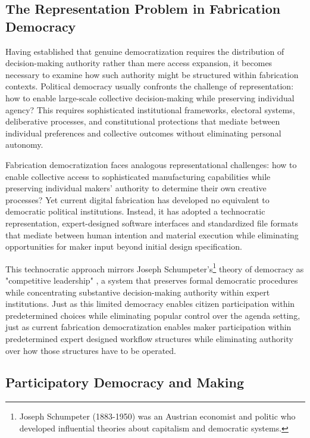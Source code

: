 \subsection{The Representation Problem in Fabrication Democracy}

Having established that genuine democratization requires the distribution of decision-making authority rather than mere access expansion, it becomes necessary to examine how such authority might be structured within fabrication contexts. Political democracy usually confronts the challenge of representation: how to enable large-scale collective decision-making while preserving individual agency? This requires sophisticated institutional frameworks, electoral systems, deliberative processes, and constitutional protections that mediate between individual preferences and collective outcomes without eliminating personal autonomy.

\vspace{0.5cm}

Fabrication democratization faces analogous representational challenges: how to enable collective access to sophisticated manufacturing capabilities while preserving individual makers' authority to determine their own creative processes? Yet current digital fabrication has developed no equivalent to democratic political institutions. Instead, it has adopted  a technocratic representation, expert-designed software interfaces and standardized file formats that mediate between human intention and material execution while eliminating opportunities for maker input beyond initial design specification.

\vspace{0.5cm}

This technocratic approach mirrors Joseph Schumpeter's\footnote{Joseph Schumpeter (1883-1950) was an Austrian economist and politic who developed influential theories about capitalism and democratic systems.} theory of democracy as "competitive leadership" \citep{schumpeter1950}, a system that preserves formal democratic procedures while concentrating substantive decision-making authority within expert institutions. Just as this limited democracy enables citizen participation within predetermined choices while eliminating popular control over the agenda setting, just as current fabrication democratization enables maker participation within predetermined expert designed workflow structures while eliminating authority over how those structures have to be operated.

\subsection{Participatory Democracy and Making}

